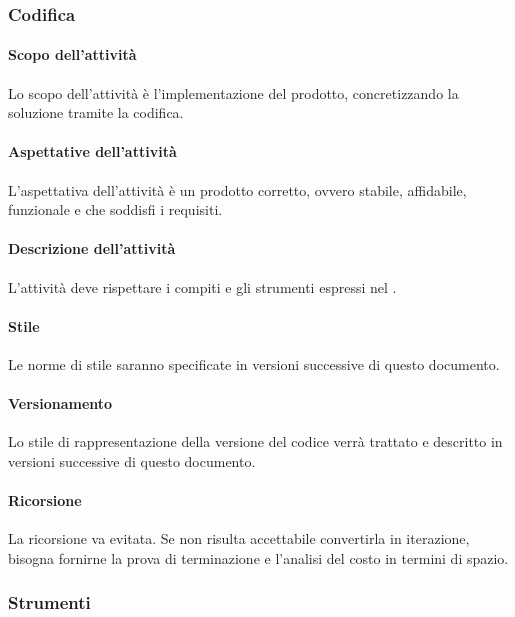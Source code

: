\subsubsection{Codifica}
 \paragraph{Scopo dell'attività}
 Lo scopo dell'attività è l'implementazione del prodotto, concretizzando la soluzione tramite la codifica.  
 \paragraph{Aspettative dell'attività}
 L'aspettativa dell'attività è un prodotto corretto, ovvero stabile, affidabile, funzionale e che soddisfi i requisiti. 
 \paragraph{Descrizione dell'attività}
 L'attività deve rispettare i compiti e gli strumenti espressi nel \PPdocRR.
 \paragraph{Stile}
Le norme di stile saranno specificate in versioni successive di questo documento.
 \paragraph{Versionamento}
 Lo stile di rappresentazione della versione del codice verrà trattato e descritto in versioni successive di questo documento.
 \paragraph{Ricorsione}
 La ricorsione va evitata. Se non risulta accettabile convertirla in iterazione, bisogna fornirne la prova di terminazione e l'analisi del costo in termini di spazio.
\subsubsection{Strumenti}
